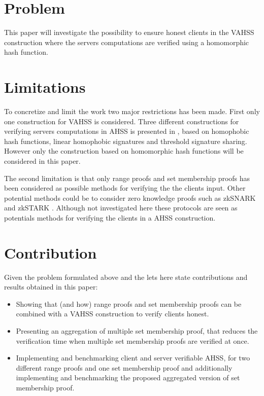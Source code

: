 \section*{Problem}
This paper will investigate the possibility to ensure honest clients in the VAHSS construction where the servers computations are verified using a homomorphic hash function. 


\section*{Limitations}
To concretize and limit the work two major restrictions has been made. First only one construction for  VAHSS is considered. Three different constructions for verifying servers computations in AHSS is presented in \cite{SumItUp}, based on homophobic hash functions, linear homophobic signatures and threshold signature sharing.  However only  the construction based on homomorphic hash functions will be considered in this paper. 

The second limitation is that only range proofs and set membership proofs has been considered as possible methods for verifying the the clients input. Other potential methods could be to consider zero knowledge proofs such as zkSNARK and zkSTARK \cite{zkSnark} \cite{zkStark}. Although not investigated here these protocols are seen as potentials methods for verifying the clients in a AHSS construction.  

\section*{Contribution}
Given the problem formulated above and the lets here state contributions and results obtained in this paper:
\begin{itemize}
	\item Showing that (and how) range proofs and set membership proofs can be combined with a VAHSS construction to verify clients honest. 
\item Presenting an aggregation of multiple set membership proof, that reduces the verification time when multiple set membership proofs are verified at once. 
\item Implementing and benchmarking client and server verifiable AHSS, for two different range proofs and one set membership proof and additionally implementing and benchmarking the proposed aggregated version of set membership proof. 
\end{itemize}

